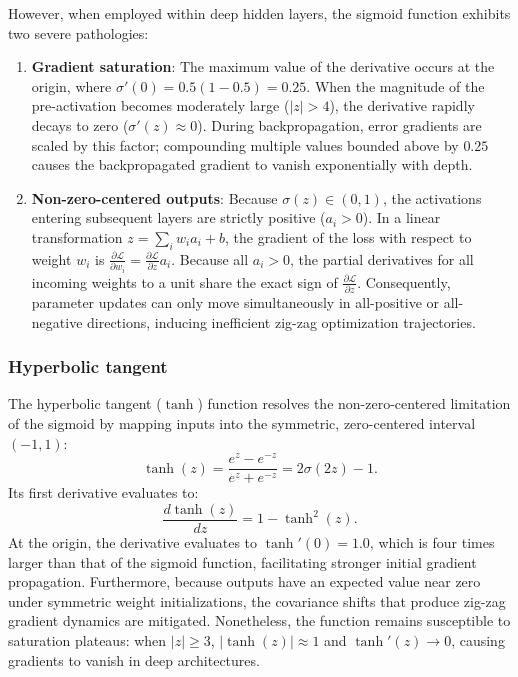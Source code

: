\documentclass[../../../main.tex]{subfiles}
\begin{document}
However, when employed within deep hidden layers, the sigmoid function exhibits two severe pathologies:
\begin{enumerate}[label=(\roman*)]
    \item \textbf{Gradient saturation}: The maximum value of the derivative occurs at the origin, where $\sigma'(0) = 0.5(1 - 0.5) = 0.25$. When the magnitude of the pre-activation becomes moderately large ($|z| > 4$), the derivative rapidly decays to zero ($\sigma'(z) \approx 0$). During backpropagation, error gradients are scaled by this factor; compounding multiple values bounded above by $0.25$ causes the backpropagated gradient to vanish exponentially with depth.
    \item \textbf{Non-zero-centered outputs}: Because $\sigma(z) \in (0, 1)$, the activations entering subsequent layers are strictly positive ($a_i > 0$). In a linear transformation $z = \sum_i w_i a_i + b$, the gradient of the loss with respect to weight $w_i$ is $\frac{\partial \mathcal{L}}{\partial w_i} = \frac{\partial \mathcal{L}}{\partial z} a_i$. Because all $a_i > 0$, the partial derivatives for all incoming weights to a unit share the exact sign of $\frac{\partial \mathcal{L}}{\partial z}$. Consequently, parameter updates can only move simultaneously in all-positive or all-negative directions, inducing inefficient zig-zag optimization trajectories.
\end{enumerate}

\subsubsection{Hyperbolic tangent}

The hyperbolic tangent ($\tanh$) function resolves the non-zero-centered limitation of the sigmoid by mapping inputs into the symmetric, zero-centered interval $(-1, 1)$:
\begin{equation}
\tanh(z) = \frac{e^z - e^{-z}}{e^z + e^{-z}} = 2\sigma(2z) - 1.
\end{equation}
Its first derivative evaluates to:
\begin{equation}
\frac{d\tanh(z)}{dz} = 1 - \tanh^2(z).
\end{equation}
At the origin, the derivative evaluates to $\tanh'(0) = 1.0$, which is four times larger than that of the sigmoid function, facilitating stronger initial gradient propagation. Furthermore, because outputs have an expected value near zero under symmetric weight initializations, the covariance shifts that produce zig-zag gradient dynamics are mitigated. Nonetheless, the function remains susceptible to saturation plateaus: when $|z| \ge 3$, $|\tanh(z)| \approx 1$ and $\tanh'(z) \to 0$, causing gradients to vanish in deep architectures.
\end{document}
